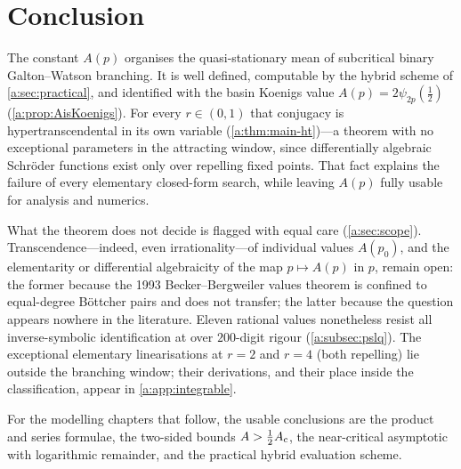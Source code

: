 \section{Conclusion}
\label{a:sec:conclusion}

The constant $A(p)$ organises the quasi-stationary mean of subcritical binary
Galton--Watson branching. It is well defined, computable by the hybrid scheme of
\cref{a:sec:practical}, and identified with the basin Koenigs value
$A(p)=2\psi_{2p}(\tfrac12)$ (\cref{a:prop:AisKoenigs}). For every $r\in(0,1)$ that
conjugacy is hypertranscendental in its own variable (\cref{a:thm:main-ht})---a theorem
with no exceptional parameters in the attracting window, since differentially algebraic
Schr\"oder functions exist only over repelling fixed points. That fact explains the
failure of every elementary closed-form search, while leaving $A(p)$ fully usable for
analysis and numerics.

What the theorem does not decide is flagged with equal care (\cref{a:sec:scope}).
Transcendence---indeed, even irrationality---of individual values $A(p_0)$, and the
elementarity or differential algebraicity of the map $p\mapsto A(p)$ in $p$, remain open:
the former because the 1993 Becker--Bergweiler values theorem is confined to equal-degree
B\"ottcher pairs and does not transfer; the latter because the question appears nowhere
in the literature. Eleven rational values nonetheless resist all inverse-symbolic
identification at over $200$-digit rigour (\cref{a:subsec:pslq}). The exceptional
elementary linearisations at $r=2$ and $r=4$ (both repelling) lie outside the branching
window; their derivations, and their place inside the classification, appear in
\cref{a:app:integrable}.

For the modelling chapters that follow, the usable conclusions are the product and series
formulae, the two-sided bounds $A>\tfrac12A_{\mathrm{c}}$, the near-critical asymptotic with
logarithmic remainder, and the practical hybrid evaluation scheme.
